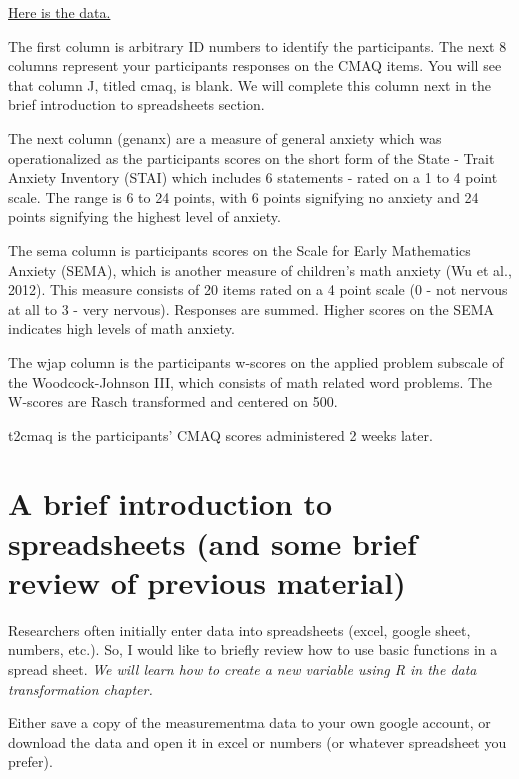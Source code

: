 \documentclass[
]{book}
\begin{document}
\href{https://docs.google.com/spreadsheets/d/1UyfrP8h9nsyBCA-KpJAGUFFAzcHO5-RjBfJdeUULPOg/edit?usp=sharing}{Here is the data.}

The first column is arbitrary ID numbers to identify the participants. The next 8 columns represent your participants responses on the CMAQ items. You will see that column J, titled cmaq, is blank. We will complete this column next in the brief introduction to spreadsheets section.

The next column (genanx) are a measure of general anxiety which was operationalized as the participants scores on the short form of the State - Trait Anxiety Inventory (STAI) which includes 6 statements - rated on a 1 to 4 point scale. The range is 6 to 24 points, with 6 points signifying no anxiety and 24 points signifying the highest level of anxiety.

The sema column is participants scores on the Scale for Early Mathematics Anxiety (SEMA), which is another measure of children's math anxiety (Wu et al., 2012). This measure consists of 20 items rated on a 4 point scale (0 - not nervous at all to 3 - very nervous). Responses are summed. Higher scores on the SEMA indicates high levels of math anxiety.

The wjap column is the participants w-scores on the applied problem subscale of the Woodcock-Johnson III, which consists of math related word problems. The W-scores are Rasch transformed and centered on 500.

t2cmaq is the participants' CMAQ scores administered 2 weeks later.

\hypertarget{a-brief-introduction-to-spreadsheets-and-some-brief-review-of-previous-material}{%
\section{A brief introduction to spreadsheets (and some brief review of previous material)}\label{a-brief-introduction-to-spreadsheets-and-some-brief-review-of-previous-material}}

Researchers often initially enter data into spreadsheets (excel, google sheet, numbers, etc.). So, I would like to briefly review how to use basic functions in a spread sheet. \emph{We will learn how to create a new variable using R in the data transformation chapter.}

Either save a copy of the measurementma data to your own google account, or download the data and open it in excel or numbers (or whatever spreadsheet you prefer).
\end{document}
